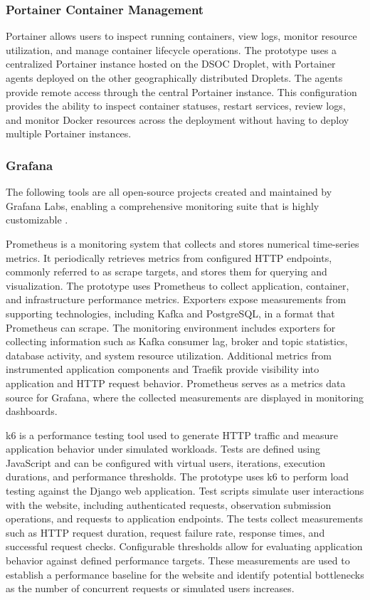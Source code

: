 \documentclass[12pt]{article}
\begin{document}
\subsubsection*{Portainer Container Management}
Portainer allows users to inspect running containers, view logs, monitor resource utilization, and manage container lifecycle operations. The prototype uses a centralized Portainer instance hosted on the DSOC Droplet, with Portainer agents deployed on the other geographically distributed Droplets. The agents provide remote access through the central Portainer instance. This configuration provides the ability to inspect container statuses, restart services, review logs, and monitor Docker resources across the deployment without having to deploy multiple Portainer instances.

\subsubsection*{Grafana}
The following tools are all open-source projects created and maintained by Grafana Labs, enabling a comprehensive monitoring suite that is highly customizable \cite{grafana_labs_technical_nodate}. 

Prometheus is a monitoring system that collects and stores numerical time-series metrics. It periodically retrieves metrics from configured HTTP endpoints, commonly referred to as scrape targets, and stores them for querying and visualization. The prototype uses Prometheus to collect application, container, and infrastructure performance metrics. Exporters expose measurements from supporting technologies, including Kafka and PostgreSQL, in a format that Prometheus can scrape. The monitoring environment includes exporters for collecting information such as Kafka consumer lag, broker and topic statistics, database activity, and system resource utilization. Additional metrics from instrumented application components and Traefik provide visibility into application and HTTP request behavior. Prometheus serves as a metrics data source for Grafana, where the collected measurements are displayed in monitoring dashboards.

k6 is a performance testing tool used to generate HTTP traffic and measure application behavior under simulated workloads. Tests are defined using JavaScript and can be configured with virtual users, iterations, execution durations, and performance thresholds. The prototype uses k6 to perform load testing against the Django web application. Test scripts simulate user interactions with the website, including authenticated requests, observation submission operations, and requests to application endpoints. The tests collect measurements such as HTTP request duration, request failure rate, response times, and successful request checks. Configurable thresholds allow for evaluating application behavior against defined performance targets. These measurements are used to establish a performance baseline for the website and identify potential bottlenecks as the number of concurrent requests or simulated users increases.
\end{document}
